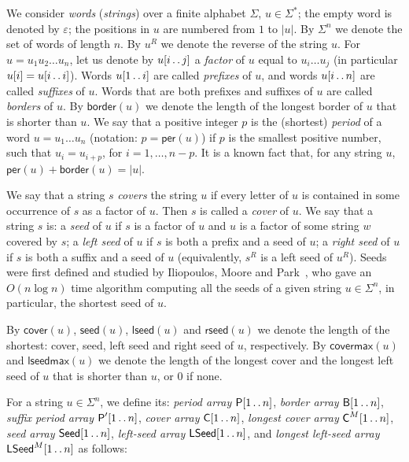 \documentclass{llncs}
\newcommand{\per}{\textsf{per}}
\newcommand{\border}{\textsf{border}}
\newcommand{\cover}{\textsf{cover}}
\newcommand{\covermax}{\textsf{covermax}}
\newcommand{\lseed}{\textsf{lseed}}
\newcommand{\lseedmax}{\textsf{lseedmax}}
\newcommand{\rseed}{\textsf{rseed}}
\newcommand{\seed}{\textsf{seed}}
\newcommand{\Cover}{\textsf{C}}
\newcommand{\LSeed}{\textsf{LSeed}}
\newcommand{\Seed}{\textsf{Seed}}
\newcommand{\Border}{\textsf{B}}
\newcommand{\Period}{\textsf{P}}
\def\dotdot{\mathinner{\ldotp\ldotp}}
\begin{document}
    We consider \emph{words} (\emph{strings}) over a finite alphabet $\Sigma$, $u \in \Sigma^*$;
    the empty word is denoted by $\varepsilon$; the positions in $u$ are numbered from $1$ to $|u|$.
    By $\Sigma^n$ we denote the set of words of length $n$.
    By $u^R$ we denote the reverse of the string $u$.
    For $u=u_1u_2\ldots u_n$, let us denote by $u[i \dotdot j]$ a \emph{factor}
    of $u$ equal to $u_i\ldots u_j$ (in particular $u[i]=u[i \dotdot i]$).
    Words $u[1 \dotdot i]$ are called \emph{prefixes} of $u$, and words $u[i \dotdot n]$ are called \emph{suffixes} of $u$.
    Words that are both prefixes and suffixes of $u$ are called \emph{borders} of $u$.
    By $\border(u)$ we denote the length of the longest border of $u$ that is shorter than $u$.
    We say that a positive integer $p$ is the (shortest) \emph{period} of a word $u=u_1\ldots u_n$
    (notation: $p=\per(u)$) if $p$ is the smallest positive number, such that $u_i=u_{i+p}$, for $i=1,\dots,n-p$.
    It is a known fact \cite{AlgorithmsOnStrings,Jewels} that, for any string $u$,
    $\per(u)+\border(u) = |u|$.

    We say that a string $s$ \emph{covers} the string $u$ if every letter of $u$ is contained
    in some occurrence of $s$ as a factor of $u$.
    Then $s$ is called a \emph{cover} of $u$.
    We say that a string $s$ is:
        a \emph{seed} of $u$ if $s$ is a factor of $u$ and $u$ is a factor of some string $w$ covered by $s$;
        a \emph{left seed} of $u$ if $s$ is both a prefix and a seed of $u$;
        a \emph{right seed} of $u$ if $s$ is both a suffix and a seed of $u$
        (equivalently, $s^R$ is a left seed of $u^R$).
    Seeds were first defined and studied by Iliopoulos, Moore and Park~\cite{DBLP:journals/algorithmica/IliopoulosMP96},
    who gave an $O(n\log{n})$ time algorithm computing all the seeds of a given string $u \in \Sigma^n$,
    in particular, the shortest seed of $u$.

    By $\cover(u)$, $\seed(u)$, $\lseed(u)$ and $\rseed(u)$ we denote the length of the shortest:
    cover, seed, left seed and right seed of $u$, respectively.
    By $\covermax(u)$ and $\lseedmax(u)$ we denote the length of the longest cover and the longest left seed of $u$
    that is shorter than $u$, or 0 if none.

    For a string $u \in \Sigma^n$, we define its:
    \emph{period array}            $\Period[1 \dotdot n]$,
    \emph{border array}            $\Border[1 \dotdot n]$,
    \emph{suffix period array}     $\Period'[1 \dotdot n]$,
    \emph{cover array}             $\Cover [1 \dotdot n]$,
    \emph{longest cover array}     $\Cover^M[1 \dotdot n]$,
    \emph{seed array}              $\Seed  [1 \dotdot n]$,
    \emph{left-seed array}         $\LSeed [1 \dotdot n]$, and
    \emph{longest left-seed array} $\LSeed^M[1 \dotdot n]$ as follows:
\end{document}
